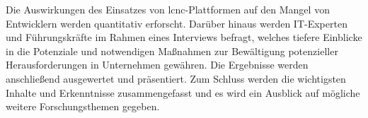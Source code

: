 Die Auswirkungen des Einsatzes von \ac{lcnc}-Plattformen auf den Mangel von Entwicklern werden quantitativ erforscht. Darüber hinaus werden IT-Experten und Führungskräfte im Rahmen eines Interviews befragt, welches tiefere Einblicke in die Potenziale und notwendigen Maßnahmen zur Bewältigung potenzieller Herausforderungen in Unternehmen gewähren. Die Ergebnisse werden anschließend ausgewertet und präsentiert. Zum Schluss werden die wichtigsten Inhalte und Erkenntnisse zusammengefasst und es wird ein Ausblick auf mögliche weitere Forschungsthemen gegeben.

